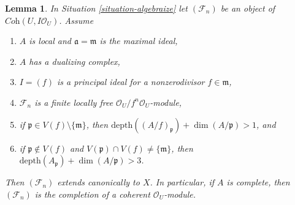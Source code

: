 \documentclass{stacks-project}
\theoremstyle{plain}
\newtheorem{lemma}[subsection]{Lemma}
\theoremstyle{definition}
\theoremstyle{remark}
\numberwithin{equation}{subsection}
\begin{document}
\begin{lemma}
\label{lemma-algebraization-principal}
In Situation \ref{situation-algebraize} let $(\mathcal{F}_n)$ be an object
of $\textit{Coh}(U, I\mathcal{O}_U)$. Assume
\begin{enumerate}
\item $A$ is local and $\mathfrak a = \mathfrak m$ is the maximal ideal,
\item $A$ has a dualizing complex,
\item $I = (f)$ is a principal ideal for a nonzerodivisor $f \in \mathfrak m$,
\item $\mathcal{F}_n$ is a finite locally free
$\mathcal{O}_U/f^n\mathcal{O}_U$-module,
\item if $\mathfrak p \in V(f) \setminus \{\mathfrak m\}$, then
$\text{depth}((A/f)_\mathfrak p) + \dim(A/\mathfrak p) > 1$, and
\item if $\mathfrak p \not \in V(f)$ and
$V(\mathfrak p) \cap V(f) \not = \{\mathfrak m\}$, then
$\text{depth}(A_\mathfrak p) + \dim(A/\mathfrak p) > 3$.
\end{enumerate}
Then $(\mathcal{F}_n)$ extends canonically to $X$. In particular, if $A$
is complete, then $(\mathcal{F}_n)$ is the completion of a coherent
$\mathcal{O}_U$-module.
\end{lemma}
\end{document}
